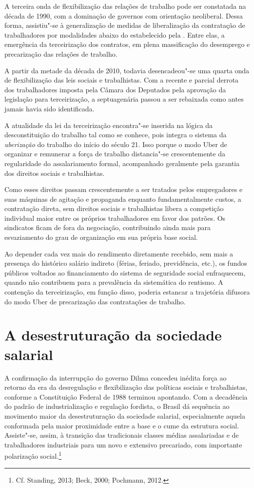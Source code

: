 A terceira onda de flexibilização das relações de trabalho pode ser
constatada na década de 1990, com a dominação de governos com orientação
neoliberal. Dessa forma, assistiu"-se à generalização de medidas de
liberalização da contratação de trabalhadores por modalidades abaixo do
estabelecido pela . Entre elas, a emergência da
terceirização dos contratos, em plena massificação do desemprego e
precarização das relações de trabalho.

A partir da metade da década de 2010, todavia desencadeou"-se uma quarta
onda de flexibilização das leis sociais e trabalhistas. Com a recente e
parcial derrota dos trabalhadores imposta pela Câmara dos Deputados pela
aprovação da legislação para terceirização, a septuagenária  passou a
ser rebaixada como antes jamais havia sido identificada.

A atualidade da lei da terceirização encontra"-se inserida na lógica da
desconstituição do trabalho tal como se conhece, pois integra o sistema
da \emph{uberização} do trabalho do início do século 21. Isso porque o
modo Uber de organizar e remunerar a força de trabalho distancia"-se
crescentemente da regularidade do assalariamento formal, acompanhado
geralmente pela garantia dos direitos sociais e trabalhistas.

Como esses direitos passam crescentemente a ser
tratados pelos empregadores e suas máquinas de agitação e propaganda
enquanto fundamentalmente custos, a contratação direta, sem direitos
sociais e trabalhistas libera a competição individual maior entre os
próprios trabalhadores em favor dos patrões. Os sindicatos ficam de fora
da negociação, contribuindo ainda mais para esvaziamento do grau de
organização em sua própria base social.

Ao depender cada vez mais do rendimento diretamente recebido, sem mais a
presença do histórico salário indireto (férias, feriado, previdência,
etc.), os fundos públicos voltados ao financiamento do sistema de
seguridade social enfraquecem, quando não contribuem para a prevalência
da sistemática do rentismo. A contenção da terceirização, em função
disso, poderia estancar a trajetória difusora do modo Uber de
precarização das contratações de trabalho.

\section{A desestruturação da sociedade salarial}

A confirmação da interrupção do governo Dilma concedeu inédita força ao
retorno da era da desregulação e flexibilização das políticas sociais e
trabalhistas, conforme a Constituição Federal de 1988 terminou
apontando. Com a decadência do padrão de industrialização e regulação
fordista, o Brasil dá sequência ao movimento maior da desestruturação da
sociedade salarial, especialmente aquela conformada pela maior
proximidade entre a base e o cume da estrutura social. Assiste"-se,
assim, à transição das tradicionais classes médias assalariadas e de
trabalhadores industriais para um novo e extensivo precariado, com
importante polarização social.\footnote{Cf. Standing, 2013; Beck, 2000; Pochmann,
2012.}

